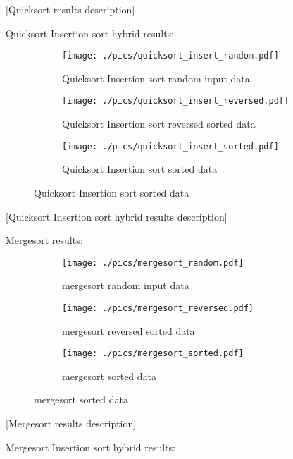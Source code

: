 [Quicksort results description]

Quicksort Insertion sort hybrid results:

\begin{figure}[H]
	\centering
	\begin{subfigure}[b]{0.5\textwidth}
		\centering
		\texttt{[image: ./pics/quicksort\_insert\_random.pdf]}
		\caption{Quicksort Insertion sort random input data}
	\end{subfigure}
	\hfill
	\begin{subfigure}[b]{0.5\textwidth}
		\centering
		\texttt{[image: ./pics/quicksort\_insert\_reversed.pdf]}
		\caption{Quicksort Insertion sort reversed sorted data}
	\end{subfigure}
	\hfill
	\begin{subfigure}[b]{0.5\textwidth}
		\centering
		\texttt{[image: ./pics/quicksort\_insert\_sorted.pdf]}
		\caption{Quicksort Insertion sort sorted data}
	\end{subfigure}
\end{figure}

[Quicksort Insertion sort hybrid results description]

Mergesort results:

\begin{figure}[H]
	\centering
	\begin{subfigure}[b]{0.5\textwidth}
		\centering
		\texttt{[image: ./pics/mergesort\_random.pdf]}
		\caption{mergesort random input data}
	\end{subfigure}
	\hfill
	\begin{subfigure}[b]{0.5\textwidth}
		\centering
		\texttt{[image: ./pics/mergesort\_reversed.pdf]}
		\caption{mergesort reversed sorted data}
	\end{subfigure}
	\hfill
	\begin{subfigure}[b]{0.5\textwidth}
		\centering
		\texttt{[image: ./pics/mergesort\_sorted.pdf]}
		\caption{mergesort sorted data}
	\end{subfigure}
\end{figure}

[Mergesort results description]

Mergesort Insertion sort hybrid results:

